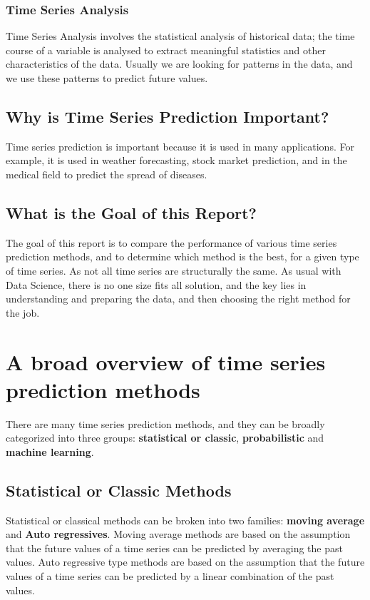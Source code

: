 \documentclass[manuscript,screen,nonacm,11pt]{acmart}
\numberwithin{equation}{section}
\begin{document}
\subsubsection{Time Series Analysis}
Time Series Analysis involves the statistical analysis of historical data; the time course of a variable is analysed to extract meaningful statistics and other characteristics of the data.
Usually we are looking for patterns in the data, and we use these patterns to predict future values.


\subsection{Why is Time Series Prediction Important?}
Time series prediction is important because it is used in many applications.
For example, it is used in weather forecasting, stock market prediction, and in the medical field to predict the spread of diseases.
\subsection{What is the Goal of this Report?}
The goal of this report is to compare the performance of various
time series prediction methods, and to determine which method is the best,
for a given type of time series. As not all time series are structurally
the same. As usual with Data Science, there is no one size fits all solution,
and the key lies in understanding and preparing the data, and then
choosing the right method for the job.
\section{A broad overview of time series prediction methods}
\label{sec:overview}
There are many time series prediction methods, and they can be broadly
categorized into three groups: \textbf{statistical or classic}, \textbf{probabilistic} and \textbf{machine learning}.
\subsection{Statistical or Classic Methods}
Statistical or classical methods can be broken into two families: \textbf{moving average} and \textbf{Auto regressives}.
Moving average methods are based on the assumption that the future values of a time series can be predicted by averaging the past values.
Auto regressive type methods are based on the assumption that the future values of a time series can be predicted by a linear combination of the past values.
\end{document}
